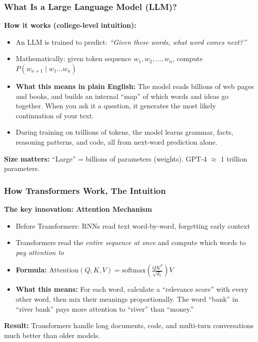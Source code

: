 \begin{frame}[fragile]\frametitle{What Is a Large Language Model (LLM)?}
\textbf{How it works (college-level intuition):}
\begin{itemize}
\item An LLM is trained to predict: \textit{``Given these words, what word comes next?''}
\item Mathematically: given token sequence $w_1, w_2, \ldots, w_n$, compute $P(w_{n+1} \mid w_1 \ldots w_n)$
\item \textbf{What this means in plain English:} The model reads billions of web pages and books, and builds an internal ``map'' of which words and ideas go together. When you ask it a question, it generates the most likely continuation of your text.
\item During training on trillions of tokens, the model learns grammar, facts, reasoning patterns, and code, all from next-word prediction alone.
\end{itemize}
\textbf{Size matters:} ``Large'' = billions of parameters (weights). GPT-4 $\approx$ 1 trillion parameters.
\end{frame}

\begin{frame}[fragile]\frametitle{How Transformers Work, The Intuition}
\textbf{The key innovation: Attention Mechanism}
\begin{itemize}
\item Before Transformers: RNNs read text word-by-word, forgetting early context
\item Transformers read the \textit{entire sequence at once} and compute which words to \textit{pay attention to}
\item \textbf{Formula:} $\text{Attention}(Q, K, V) = \text{softmax}\!\left(\frac{QK^T}{\sqrt{d_k}}\right)V$
\item \textbf{What this means:} For each word, calculate a ``relevance score'' with every other word, then mix their meanings proportionally. The word ``bank'' in ``river bank'' pays more attention to ``river'' than ``money.''
\end{itemize}
\textbf{Result:} Transformers handle long documents, code, and multi-turn conversations much better than older models.
\end{frame}


